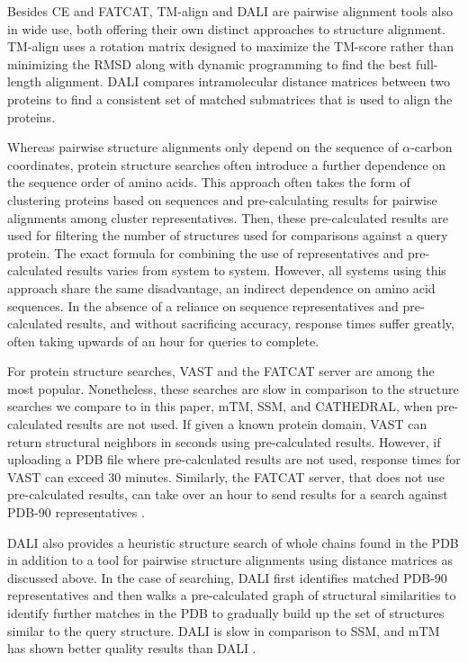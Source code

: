 \documentclass[10pt,letterpaper]{article}
\newcommand{\ca}{$\alpha$-carbon\xspace}
\begin{document}
Besides CE and FATCAT, TM-align \cite{Zhang2005} and DALI \cite{Sander1995} are pairwise alignment tools also in wide use, both offering their own distinct approaches to structure alignment. 
TM-align uses a rotation matrix designed to maximize the TM-score rather than minimizing the RMSD along with dynamic programming to find the best full-length alignment. 
DALI compares intramolecular distance matrices between two proteins to find a consistent set of matched submatrices that is used to align the proteins. 

Whereas pairwise structure alignments only depend on the sequence of \ca coordinates, protein structure searches often introduce a further dependence on the sequence order of amino acids.
This approach often takes the form of clustering proteins based on sequences and pre-calculating results for pairwise alignments among cluster representatives. 
Then, these pre-calculated results are used for filtering the number of structures used for comparisons against a query protein.
The exact formula for combining the use of representatives and pre-calculated results varies from system to system.
However, all systems using this approach share the same disadvantage, an indirect dependence on amino acid sequences. 
In the absence of a reliance on sequence representatives and pre-calculated results, and without sacrificing accuracy, response times suffer greatly, often taking upwards of an hour for queries to complete. 

For protein structure searches, VAST \cite{Gilbrat1996} and the FATCAT server \cite{Ye2004} are among the most popular. 
Nonetheless, these searches are slow in comparison to the structure searches we compare to in this paper, mTM, SSM, and CATHEDRAL, when pre-calculated results are not used. 
If given a known protein domain, VAST can return structural neighbors in seconds using pre-calculated results. 
However, if uploading a PDB file where pre-calculated results are not used, response times for VAST can exceed 30 minutes. 
Similarly, the FATCAT server, that does not use pre-calculated results, can take over an hour to send results for a search against PDB-90 representatives \cite{Prlic2010}. 

DALI also provides a heuristic structure search \cite{Holm2010} of whole chains found in the PDB in addition to a tool for pairwise structure alignments using distance matrices as discussed above. 
In the case of searching, DALI first identifies matched PDB-90 representatives and then walks a pre-calculated graph of structural similarities to identify further matches in the PDB to gradually build up the set of structures similar to the query structure. 
DALI is slow in comparison to SSM, and mTM has shown better quality results than DALI \cite{Dong2018}.
\end{document}
